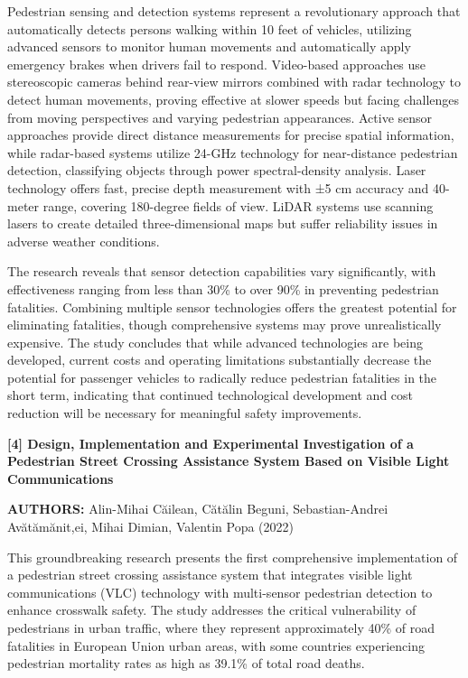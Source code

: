 \documentclass[a4paper, 12pt]{report}
\begin{document}
Pedestrian sensing and detection systems represent a revolutionary approach that automatically detects persons walking within 10 feet of vehicles, utilizing advanced sensors to monitor human movements and automatically apply emergency brakes when drivers fail to respond. Video-based approaches use stereoscopic cameras behind rear-view mirrors combined with radar technology to detect human movements, proving effective at slower speeds but facing challenges from moving perspectives and varying pedestrian appearances.
Active sensor approaches provide direct distance measurements for precise spatial information, while radar-based systems utilize 24-GHz technology for near-distance pedestrian detection, classifying objects through power spectral-density analysis. Laser technology offers fast, precise depth measurement with ±5 cm accuracy and 40-meter range, covering 180-degree fields of view. LiDAR systems use scanning lasers to create detailed three-dimensional maps but suffer reliability issues in adverse weather conditions.

The research reveals that sensor detection capabilities vary significantly, with effectiveness ranging from less than 30\% to over 90\% in preventing pedestrian fatalities. Combining multiple sensor technologies offers the greatest potential for eliminating fatalities, though comprehensive systems may prove unrealistically expensive. The study concludes that while advanced technologies are being developed, current costs and operating limitations substantially decrease the potential for passenger vehicles to radically reduce pedestrian fatalities in the short term, indicating that continued technological development and cost reduction will be necessary for meaningful safety improvements.

\noindent \textbf{[4] Design, Implementation and Experimental Investigation of a Pedestrian Street Crossing Assistance System Based on Visible Light Communications}

\textbf{AUTHORS:} Alin-Mihai Căilean, Cătălin Beguni, Sebastian-Andrei Avătămănit,ei, Mihai Dimian, Valentin Popa (2022)


This groundbreaking research presents the first comprehensive implementation of a pedestrian street crossing assistance system that integrates visible light communications (VLC) technology with multi-sensor pedestrian detection to enhance crosswalk safety. The study addresses the critical vulnerability of pedestrians in urban traffic, where they represent approximately 40\% of road fatalities in European Union urban areas, with some countries experiencing pedestrian mortality rates as high as 39.1\% of total road deaths.
\end{document}
